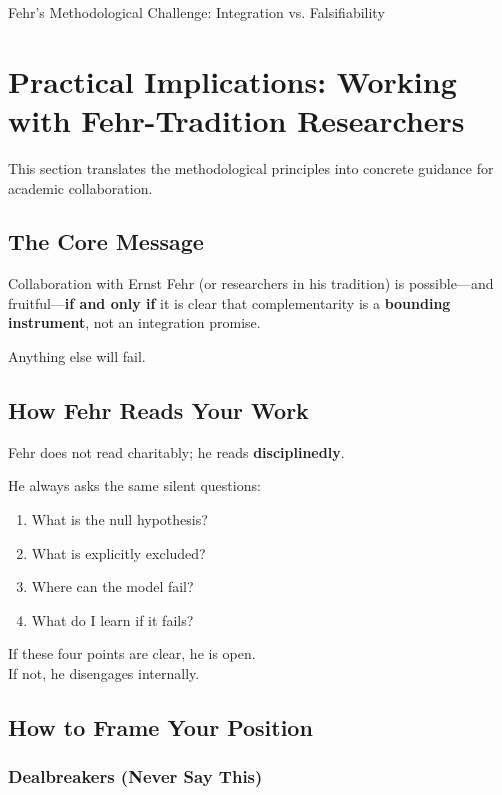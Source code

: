 \begin{chapter}{Fehr's Methodological Challenge: Integration vs. Falsifiability}
\section{Practical Implications: Working with Fehr-Tradition Researchers}
\label{sec:practical}

This section translates the methodological principles into concrete guidance for academic collaboration.

\subsection{The Core Message}

\begin{tcolorbox}[colback=blue!5!white,colframe=blue!75!black,title=\textbf{Collaboration Condition}]
Collaboration with Ernst Fehr (or researchers in his tradition) is possible---and fruitful---\textbf{if and only if} it is clear that complementarity is a \textbf{bounding instrument}, not an integration promise.

Anything else will fail.
\end{tcolorbox}

\subsection{How Fehr Reads Your Work}

Fehr does not read charitably; he reads \textbf{disciplinedly}.

He always asks the same silent questions:
\begin{enumerate}
    \item What is the null hypothesis?
    \item What is explicitly excluded?
    \item Where can the model fail?
    \item What do I learn if it fails?
\end{enumerate}

If these four points are clear, he is open.\\
If not, he disengages internally.

\subsection{How to Frame Your Position}

\subsubsection{Dealbreakers (Never Say This)}


\end{chapter}
